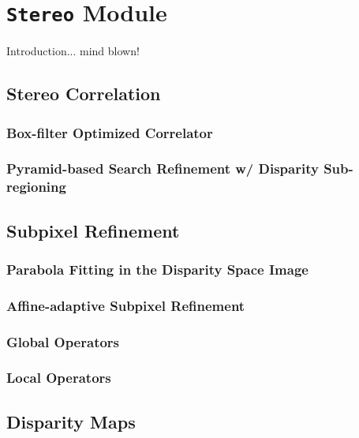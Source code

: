 \chapter{{\tt Stereo} Module}\label{ch:stereo-module}

Introduction... mind blown!

\section{Stereo Correlation}
\label{sec:stereo_correlation}

\subsection{Box-filter Optimized Correlator}

\subsection{Pyramid-based Search Refinement w/ Disparity Sub-regioning}


\section{Subpixel Refinement}
\label{sec:subpixel_refinement}

\subsection{Parabola Fitting in the Disparity Space Image}

\subsection{Affine-adaptive Subpixel Refinement}

\subsection{Global Operators}

\subsection{Local Operators}

\section{Disparity Maps}

